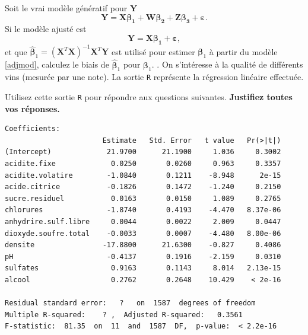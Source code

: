 \begin{questions}
Soit le vrai modèle génératif pour $\boldsymbol{Y}$ 
\begin{equation}\label{truemod}
    \boldsymbol{Y} = \boldsymbol{X\beta_1} + \boldsymbol{W\beta_2} + \boldsymbol{Z\beta_3} +\boldsymbol{\varepsilon}.
\end{equation}
Si le modèle ajusté est
\begin{equation}\label{adjmod}
    \boldsymbol{Y} = \boldsymbol{X\beta_1} +\boldsymbol{\varepsilon},
\end{equation}
et que $\widehat{\boldsymbol{\beta}}_1=(\boldsymbol{X}^T\boldsymbol{X})^{-1}\boldsymbol{X}^T\boldsymbol{Y}$ est utilisé pour estimer $\boldsymbol{\beta}_1$ à partir du modèle \eqref{adjmod}, calculez le biais de $\widehat{\boldsymbol{\beta}}_1$ pour $\boldsymbol{\beta}_1$.
\newpage
.
\newpage
\question\label{analyse}
On s'intéresse à la qualité de différents vins (mesurée par une note). La sortie \texttt{R} représente la régression linéaire effectuée.

 Utilisez cette sortie \texttt{R}  pour répondre aux questions suivantes. {\bf Justifiez toutes vos réponses.}
\begin{verbatim}
Coefficients:
                       Estimate   Std. Error   t value   Pr(>|t|)    
(Intercept)             21.9700      21.1900     1.036     0.3002    
acidite.fixe             0.0250       0.0260     0.963     0.3357    
acidite.volatire        -1.0840       0.1211    -8.948      2e-15
acide.citrice           -0.1826       0.1472    -1.240     0.2150    
sucre.residuel           0.0163       0.0150     1.089     0.2765    
chlorures               -1.8740       0.4193    -4.470   8.37e-06 
anhydrire.sulf.libre     0.0044       0.0022     2.009     0.0447 
dioxyde.soufre.total    -0.0033       0.0007    -4.480   8.00e-06 
densite                -17.8800      21.6300    -0.827     0.4086    
pH                      -0.4137       0.1916    -2.159     0.0310 
sulfates                 0.9163       0.1143     8.014   2.13e-15 
alcool                   0.2762       0.2648    10.429    < 2e-16 

Residual standard error:   ?   on  1587  degrees of freedom
Multiple R-squared:    ? ,	Adjusted R-squared:   0.3561 
F-statistic:  81.35  on  11  and  1587  DF,  p-value:  < 2.2e-16    
\end{verbatim}

\end{questions}
